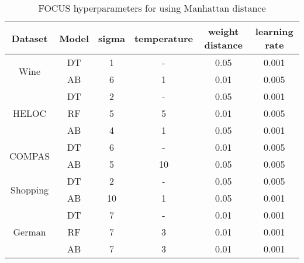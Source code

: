 \begin{table}[htb]
\centering
\begin{tabular}{cccccc}
Dataset                   & Model & sigma & temperature & weight distance & learning rate \\ \hline
\multirow{2}{*}{Wine}     & DT    & 1     & -          & 0.05            & 0.001         \\
                          & AB    & 6     & 1           & 0.01            & 0.005         \\ \hline
\multirow{3}{*}{HELOC}    & DT    & 2     & -          & 0.05            & 0.001         \\
                          & RF    & 5     & 5           & 0.01            & 0.005         \\
                          & AB    & 4     & 1           & 0.05            & 0.001         \\ \hline
\multirow{2}{*}{COMPAS}   & DT    & 6     & -          & 0.01            & 0.005         \\
                          & AB    & 5     & 10          & 0.05            & 0.005         \\ \hline
\multirow{2}{*}{Shopping} & DT    & 2     & -          & 0.05            & 0.005         \\
                          & AB    & 10    & 1           & 0.05            & 0.001         \\ \hline
\multirow{3}{*}{German}   & DT    & 7     & -           & 0.01            & 0.001         \\
                          & RF    & 7     & 3           & 0.01            & 0.001         \\
                          & AB    & 7     & 3           & 0.01            & 0.001         \\ \hline
\end{tabular}
\caption{FOCUS hyperparameters for using Manhattan distance}
\label{table:l1 params}
\end{table}

